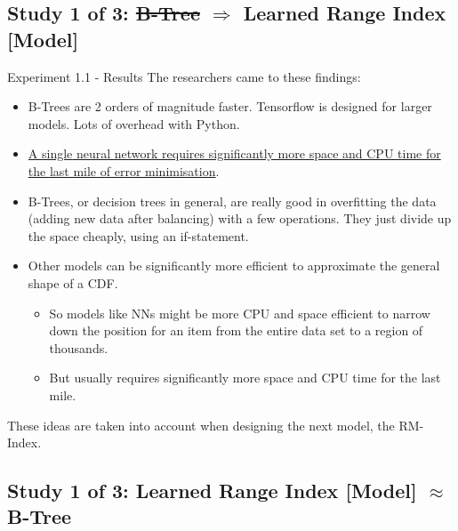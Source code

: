 \documentclass[presentation]{beamer}
\begin{document}
\subsection{Study 1 of 3: \sout{B-Tree} \(\Rightarrow\) Learned Range Index [Model]}
\label{sec:org135ef4e}
\begin{frame}[label={sec:orga9e6342}]{Experiment 1.1 - Results}
The researchers came to these findings:
\begin{itemize}
\item B-Trees are 2 orders of magnitude faster. Tensorflow is designed for larger models. Lots of overhead with Python.
\item \uline{A \alert{single} neural network requires significantly more space and CPU time for the \alert{last mile} of error minimisation}.
\item B-Trees, or decision trees in general, are really good in overfitting the data (adding new data after balancing) with a \alert{few} operations. They just divide up the space cheaply, using an if-statement.
\item Other models can be significantly more efficient to approximate the general shape of a CDF.
\begin{itemize}
\item So models like NNs might be more CPU and space efficient to narrow down the position for an item from the entire data set to a region of thousands.
\item But usually requires significantly more space and CPU time for the last mile.
\end{itemize}
\end{itemize}

These ideas are taken into account when designing the next model, the \alert{RM-Index}.
\end{frame}

\subsection{Study 1 of 3: Learned Range Index [Model] \(\approx\) B-Tree}
\label{sec:org57fe07d}
\end{document}
